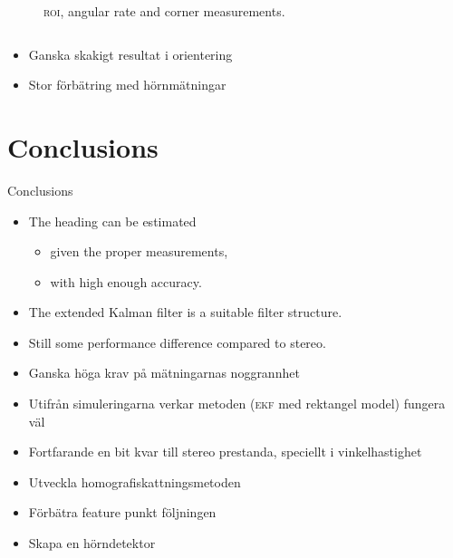 \documentclass{beamer}
\newcommand{\roi}{\textsc{roi}\xspace}
\newcommand{\ekf}{\textsc{ekf}\xspace}
\renewcommand{\a}{\r{a}\xspace}
\renewcommand{\aa}{\"a\xspace}
\renewcommand{\o}{\"o\xspace}
\begin{document}
\begin{frame}
\begin{columns}
\begin{figure}
		\caption{\roi, angular rate and corner measurements.}
	\end{figure}
	\end{columns}

	\note
	{
		\begin{itemize}
			\item Ganska skakigt resultat i orientering
			\item Stor f\o{}rb\aa{}tring med h\o{}rnm\aa{}tningar
		\end{itemize}
	}
\end{frame}

\section{Conclusions}

\begin{frame}{Conclusions}
	\begin{itemize}
		\item The heading can be estimated
		\begin{itemize}
			\item given the proper measurements,
			\item with high enough accuracy.
		\end{itemize}
		\item The extended Kalman filter is a suitable filter structure.
		\item Still some performance difference compared to stereo.
	\end{itemize}

	\note
	{
		\begin{itemize}
			\item Ganska h\o{}ga krav p\a{} m\aa{}tningarnas noggrannhet
			\item Utifr\a{}n simuleringarna verkar metoden (\ekf med rektangel model) fungera v\aa{}l
			\item Fortfarande en bit kvar till stereo prestanda, speciellt i vinkelhastighet
			\vspace{2em}
			\item Utveckla homografiskattningsmetoden
			\item F\o{}rb\aa{}tra feature punkt f\o{}ljningen
			\item Skapa en h\o{}rndetektor
		\end{itemize}
	}
\end{frame}
\end{document}
